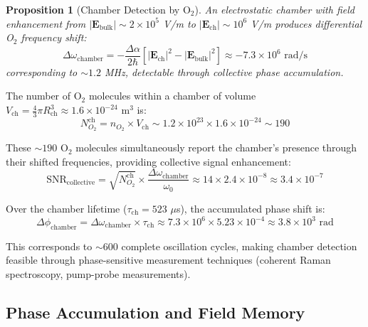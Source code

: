 \documentclass[twocolumn,10pt,aps,prd,superscriptaddress,floatfix,nofootinbib]{revtex4-2}
\newtheorem{proposition}[theorem]{Proposition}
\theoremstyle{remark}
\begin{document}
\begin{proposition}[Chamber Detection by O$_2$]
\label{prop:chamber_detection}
An electrostatic chamber with field enhancement from $|\mathbf{E}_{\mathrm{bulk}}| \sim 2 \times 10^{5}$ V/m to $|\mathbf{E}_{\mathrm{ch}}| \sim 10^{6}$ V/m produces differential O$_2$ frequency shift:
\begin{equation}
\Delta\omega_{\mathrm{chamber}} = -\frac{\Delta\alpha}{2\hbar}\left[|\mathbf{E}_{\mathrm{ch}}|^2 - |\mathbf{E}_{\mathrm{bulk}}|^2\right] \approx -7.3 \times 10^{6} \text{ rad/s}
\end{equation}
corresponding to $\sim 1.2$ MHz, detectable through collective phase accumulation.
\end{proposition}

The number of O$_2$ molecules within a chamber of volume $V_{\mathrm{ch}} = \frac{4}{3}\pi R_{\mathrm{ch}}^3 \approx 1.6 \times 10^{-24}$ m$^3$ is:
\begin{equation}
N_{O_2}^{\mathrm{ch}} = n_{O_2} \times V_{\mathrm{ch}} \sim 1.2 \times 10^{23} \times 1.6 \times 10^{-24} \sim 190
\end{equation}

These $\sim 190$ O$_2$ molecules simultaneously report the chamber's presence through their shifted frequencies, providing collective signal enhancement:
\begin{equation}
\text{SNR}_{\mathrm{collective}} = \sqrt{N_{O_2}^{\mathrm{ch}}} \times \frac{\Delta\omega_{\mathrm{chamber}}}{\omega_0} \approx 14 \times 2.4 \times 10^{-8} \approx 3.4 \times 10^{-7}
\end{equation}

Over the chamber lifetime ($\tau_{\mathrm{ch}} = 523$ $\mu$s), the accumulated phase shift is:
\begin{equation}
\Delta\phi_{\mathrm{chamber}} = \Delta\omega_{\mathrm{chamber}} \times \tau_{\mathrm{ch}} \approx 7.3 \times 10^{6} \times 5.23 \times 10^{-4} \approx 3.8 \times 10^{3} \text{ rad}
\end{equation}

This corresponds to $\sim 600$ complete oscillation cycles, making chamber detection feasible through phase-sensitive measurement techniques (coherent Raman spectroscopy, pump-probe measurements).

\subsection{Phase Accumulation and Field Memory}
\end{document}
